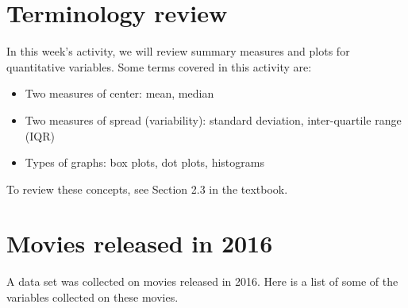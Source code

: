 \documentclass[
]{report}
\begin{document}
\hypertarget{terminology-review}{%
\section{Terminology review}\label{terminology-review}}

In this week's activity, we will review summary measures and plots for quantitative variables. Some terms covered in this activity are:

\begin{itemize}
\item
  Two measures of center: mean, median
\item
  Two measures of spread (variability): standard deviation, inter-quartile range (IQR)
\item
  Types of graphs: box plots, dot plots, histograms
\end{itemize}

To review these concepts, see Section 2.3 in the textbook.

\hypertarget{movies-released-in-2016}{%
\section{Movies released in 2016}\label{movies-released-in-2016}}

A data set was collected on movies released in 2016. Here is a list of some of the variables collected on these movies.
\end{document}
